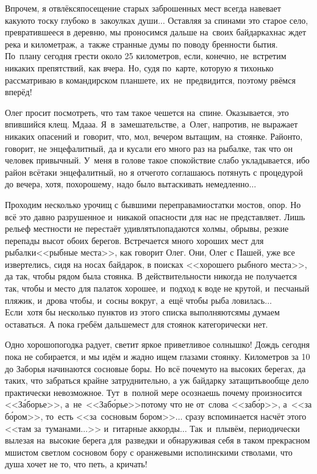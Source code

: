 Впрочем, я отвлёкся\mdash посещение старых заброшенных мест всегда навевает какую\sdash то тоску глубоко в~закоулках души$\ldots$ Оставляя за спинами это старое село, превратившееся в деревню, мы проносимся дальше на~своих байдарках\mdash нас ждет река и километраж, а~также странные думы по поводу бренности бытия. По~плану сегодня грести около 25 километров, если, конечно, не~встретим никаких препятствий, как вчера. Но, судя по~карте, которую я тихонько рассматриваю в командирском планшете, их~не~предвидится, поэтому рвёмся вперёд!

Олег просит посмотреть, что там такое чешется на~спине. Оказывается, это впившийся клещ. Мда\sdash а\sdash а. Я~в~замешательстве, а~Олег, напротив, не выражает никаких опасений и~говорит, что, мол, вечером вытащим, на~стоянке. Район\sdash то, говорит, не энцефалитный, да и кусали его много раз на рыбалке, так что он человек привычный. У~меня в голове такое спокойствие слабо укладывается, ибо район всё\sdash таки энцефалитный, но я отчего\sdash то соглашаюсь потянуть с процедурой до вечера, хотя, по\sdash хорошему, надо было вытаскивать немедленно$\ldots$

Проходим несколько урочищ с бывшими переправами\mdash остатки мостов, опор. Но всё это давно разрушенное и~никакой опасности для нас не представляет. Лишь рельеф местности не перестаёт удивлять\mdash попадаются холмы, обрывы, резкие перепады высот обоих берегов. Встречается много хороших мест для рыбалки\mdash <<рыбные места>>, как говорит Олег. Они, Олег с Пашей, уже все извертелись, сидя на носах байдарок, в поисках <<хорошего рыбного места>>, да так, чтобы рядом была стоянка. В действительности никогда не получается так, чтобы и место для палаток хорошее, и~подход к воде не крутой, и~песчаный пляжик, и~дрова чтобы, и~сосны вокруг, а~ещё чтобы рыба ловилась$\ldots$ Если~хотя бы несколько пунктов из этого списка выполняются\mdash мы думаем оставаться. А пока гребём дальше\mdash мест для стоянок категорически нет.

Одно хорошо\mdash погодка радует, светит яркое приветливое солнышко! Дождь сегодня пока не собирается, и мы идём и жадно ищем глазами стоянку. Километров за 10 до Заборья начинаются сосновые боры. Но всё почему\sdash то на высоких берегах, да таких, что забраться крайне затруднительно, а уж байдарку затащить\mdash вообще дело практически невозможное. Тут~в~полной мере осознаешь почему произносится <<З\'{а}борье>>, а~не~<<Заб\'{о}рье>>\mdash потому что не от~слова <<заб\'{о}р>>, а~<<за б\'{о}ром>>, то~есть <<за~сосновым бором>>$\ldots$ сразу вспоминается насчёт этого <<там за~туманами$\ldots$>> и~гитарные аккорды$\ldots$ Так~и~плывём, периодически вылезая на~высокие берега для~разведки и обнаруживая себя в таком прекрасном мшистом светлом сосновом бору с оранжевыми исполинскими стволами, что душа хочет не то, что петь, а кричать!

